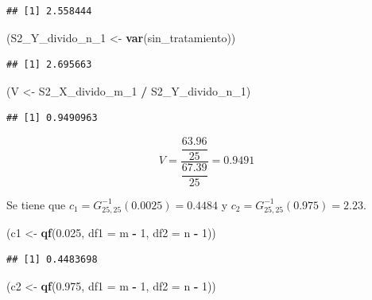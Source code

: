 \documentclass[
  12pt,
]{book}
\newenvironment{Shaded}{\begin{snugshade}}{\end{snugshade}}
\newcommand{\DataTypeTok}[1]{\textcolor[rgb]{0.13,0.29,0.53}{#1}}
\newcommand{\DecValTok}[1]{\textcolor[rgb]{0.00,0.00,0.81}{#1}}
\newcommand{\FloatTok}[1]{\textcolor[rgb]{0.00,0.00,0.81}{#1}}
\newcommand{\KeywordTok}[1]{\textcolor[rgb]{0.13,0.29,0.53}{\textbf{#1}}}
\newcommand{\NormalTok}[1]{#1}
\newcommand{\OperatorTok}[1]{\textcolor[rgb]{0.81,0.36,0.00}{\textbf{#1}}}
\newcommand{\StringTok}[1]{\textcolor[rgb]{0.31,0.60,0.02}{#1}}
\begin{document}
\begin{verbatim}
## [1] 2.558444
\end{verbatim}

\begin{Shaded}
\begin{Highlighting}[]
\NormalTok{(S2\_Y\_divido\_n\_}\DecValTok{1}\NormalTok{ \textless{}{-}}\StringTok{ }\KeywordTok{var}\NormalTok{(sin\_tratamiento))}
\end{Highlighting}
\end{Shaded}

\begin{verbatim}
## [1] 2.695663
\end{verbatim}

\begin{Shaded}
\begin{Highlighting}[]
\NormalTok{(V \textless{}{-}}\StringTok{ }\NormalTok{S2\_X\_divido\_m\_}\DecValTok{1} \OperatorTok{/}\StringTok{ }\NormalTok{S2\_Y\_divido\_n\_}\DecValTok{1}\NormalTok{)}
\end{Highlighting}
\end{Shaded}

\begin{verbatim}
## [1] 0.9490963
\end{verbatim}

\[V = \dfrac{\dfrac{63.96}{25}}{\dfrac{67.39}{25}} = 0.9491\]

Se tiene que \(c_1 = G^{-1}_{25,25}(0.0025) = 0.4484\) y \(c_2 = G^{-1}_{25,25}(0.975) = 2.23\).

\begin{Shaded}
\begin{Highlighting}[]
\NormalTok{(c1 \textless{}{-}}\StringTok{ }\KeywordTok{qf}\NormalTok{(}\FloatTok{0.025}\NormalTok{, }\DataTypeTok{df1 =}\NormalTok{ m }\OperatorTok{{-}}\StringTok{ }\DecValTok{1}\NormalTok{, }\DataTypeTok{df2 =}\NormalTok{ n }\OperatorTok{{-}}\StringTok{ }\DecValTok{1}\NormalTok{))}
\end{Highlighting}
\end{Shaded}

\begin{verbatim}
## [1] 0.4483698
\end{verbatim}

\begin{Shaded}
\begin{Highlighting}[]
\NormalTok{(c2 \textless{}{-}}\StringTok{ }\KeywordTok{qf}\NormalTok{(}\FloatTok{0.975}\NormalTok{, }\DataTypeTok{df1 =}\NormalTok{ m }\OperatorTok{{-}}\StringTok{ }\DecValTok{1}\NormalTok{, }\DataTypeTok{df2 =}\NormalTok{ n }\OperatorTok{{-}}\StringTok{ }\DecValTok{1}\NormalTok{))}
\end{Highlighting}
\end{Shaded}
\end{document}
